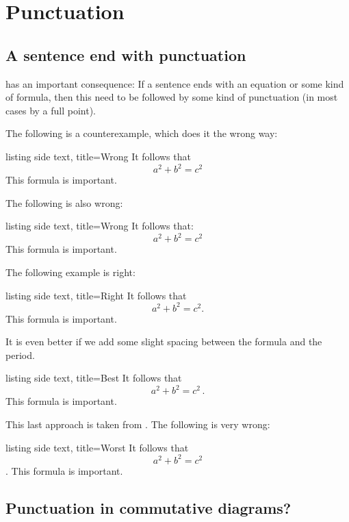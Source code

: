 \chapter{Punctuation}





\section{A sentence end with punctuation}

 has an important consequence:
If a sentence ends with an equation or some kind of formula, then this need to be followed by some kind of punctuation (in most cases by a full point).

The following is a counterexample, which does it the wrong way:
\begin{tcblisting}{listing side text, title={Wrong}}
It follows that
\[
  a^2 + b^2 = c^2
\]
This formula is important.
\end{tcblisting}
The following is also wrong:
\begin{tcblisting}{listing side text, title={Wrong}}
It follows that:
\[
  a^2 + b^2 = c^2
\]
This formula is important.
\end{tcblisting}
The following example is right:
\begin{tcblisting}{listing side text, title={Right}}
It follows that
\[
  a^2 + b^2 = c^2.
\]
This formula is important.
\end{tcblisting}
It is even better if we add some slight spacing between the formula and the period.
\begin{tcblisting}{listing side text, title={Best}}
It follows that
\[
  a^2 + b^2 = c^2 \,.
\]
This formula is important.
\end{tcblisting}
This last approach is taken from \cite{tex_period}.
The following is very wrong:
\begin{tcblisting}{listing side text, title={Worst}}
It follows that
\[
  a^2 + b^2 = c^2
\]
.
This formula is important.
\end{tcblisting}






\section{Punctuation in commutative diagrams?}

